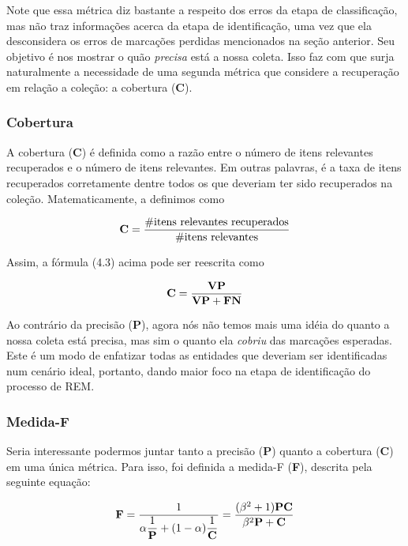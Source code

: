 \documentclass[11pt]{report}
\begin{document}
Note que essa métrica diz bastante
a respeito dos erros da etapa de classificação, mas não traz informações acerca da etapa de identificação, uma vez que ela desconsidera os erros de
marcações perdidas mencionados na seção anterior. Seu objetivo é nos mostrar o quão \textit{precisa} está a nossa coleta. Isso faz com que surja naturalmente a necessidade de uma segunda métrica que considere a recuperação em relação a coleção: a cobertura (\textbf{C}).

\subsubsection{Cobertura}

\indent\indent A cobertura (\textbf{C}) é definida como a razão entre o número de itens relevantes recuperados e o número de itens relevantes.
Em outras palavras, é a taxa de itens recuperados corretamente dentre todos os que deveriam ter sido recuperados na coleção. Matematicamente, a definimos como

\begin{equation}
 \text{\textbf{C}} = \dfrac{\text{\#itens relevantes recuperados}}{\text{\#itens relevantes}}
\end{equation}

Assim, a fórmula (4.3) acima pode ser reescrita como

\begin{equation}
 \text{\textbf{C}} = \dfrac{\text{\textbf{VP}}}{\text{\textbf{VP}} + \text{\textbf{FN}}}
\end{equation}

Ao contrário da precisão (\textbf{P}), agora nós não temos mais uma idéia do quanto a nossa coleta está precisa, mas sim o quanto ela \textit{cobriu} das marcações esperadas. Este é um modo de enfatizar todas as entidades que deveriam ser identificadas num cenário ideal, portanto, dando maior foco na etapa de identificação do processo de REM.

\subsubsection{Medida-F}

\indent\indent Seria interessante podermos juntar tanto a precisão (\textbf{P}) quanto a cobertura (\textbf{C}) em uma única métrica. Para isso, foi definida a medida-F (\textbf{F}), descrita
pela seguinte equação:

\begin{equation}
 \text{\textbf{F}} = \dfrac{1}{\alpha\dfrac{1}{\text{\textbf{P}}} + (1 - \alpha)\dfrac{1}{\text{\textbf{C}}}} = \dfrac{(\beta^2 + 1)\text{\textbf{PC}}}{\beta^2\text{\textbf{P}} + \text{\textbf{C}}}
\end{equation}
\end{document}
